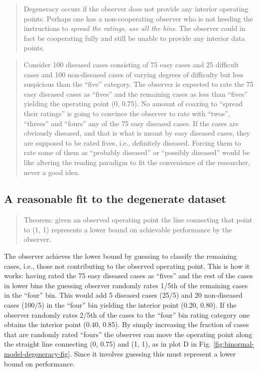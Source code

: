 \documentclass[
]{book}
\begin{document}
\begin{quote}
Degeneracy occurs if the observer does not provide any interior operating points. Perhaps one has a non-cooperating observer who is not heeding the instructions to \emph{spread the ratings, use all the bins}. The observer could in fact be cooperating fully and still be unable to provide any interior data points.
\end{quote}

\begin{quote}
Consider 100 diseased cases consisting of 75 easy cases and 25 difficult cases and 100 non-diseased cases of varying degrees of difficulty but less suspicious than the ``five'' category. The observer is expected to rate the 75 easy diseased cases as ``fives'' and the remaining cases as less than ``fives'' yielding the operating point (0, 0.75). No amount of coaxing to ``spread their ratings'' is going to convince the observer to rate with ``twos'', ``threes'' and ``fours'' any of the 75 easy diseased cases. If the cases are obviously diseased, and that is what is meant by easy diseased cases, they are supposed to be rated fives, i.e., definitely diseased. Forcing them to rate some of them as ``probably diseased'' or ``possibly diseased'' would be like altering the reading paradigm to fit the convenience of the researcher, never a good idea.
\end{quote}

\hypertarget{binormal-model-reasonable-fit}{%
\subsection{A reasonable fit to the degenerate dataset}\label{binormal-model-reasonable-fit}}

\begin{quote}
Theorem: given an observed operating point the line connecting that point to (1, 1) represents a lower bound on achievable performance by the observer.
\end{quote}

The observer achieves the lower bound by guessing to classify the remaining cases, i.e., those not contributing to the observed operating point. This is how it works: having rated the 75 easy diseased cases as ``fives'' and the rest of the cases in lower bins the guessing observer randomly rates 1/5th of the remaining cases in the ``four'' bin. This would add 5 diseased cases (25/5) and 20 non-diseased cases (100/5) in the ``four'' bin yielding the interior point (0.20, 0.80). If the observer randomly rates 2/5th of the cases to the ``four'' bin rating category one obtains the interior point (0.40, 0.85). By simply increasing the fraction of cases that are randomly rated ``fours'' the observer can move the operating point along the straight line connecting (0, 0.75) and (1, 1), as in plot D in Fig. \ref{fig:binormal-model-degeneracy-fig}. Since it involves guessing this must represent a lower bound on performance.
\end{document}
